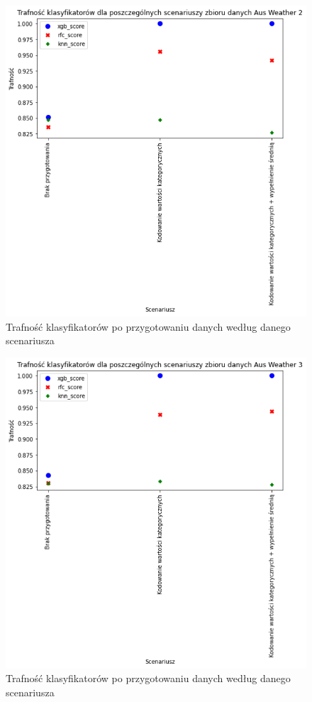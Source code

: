 \documentclass{book}
\begin{document}
\begin{figure}[H]
\centerline{\includegraphics{Aus_Weather_2_Kodowanie}}
\centering
\caption{Trafność klasyfikatorów po przygotowaniu danych 
według danego scenariusza}
\end{figure}

\begin{figure}[H]
\centerline{\includegraphics{Aus_Weather_3_Kodowanie}}
\centering
\caption{Trafność klasyfikatorów po przygotowaniu danych 
według danego scenariusza}
\end{figure}
\end{document}
